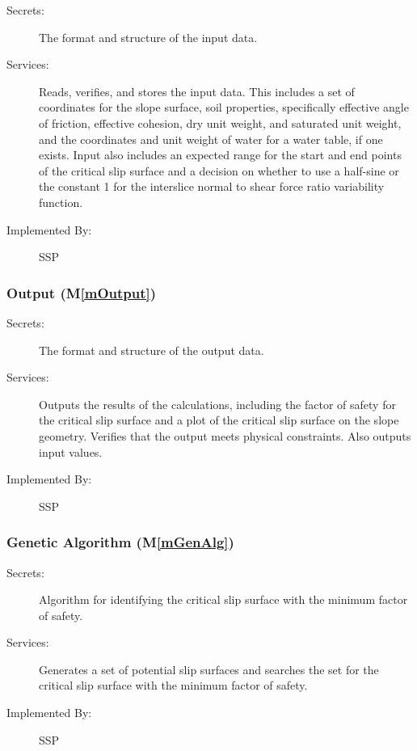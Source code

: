 \documentclass[12pt, titlepage]{article}
\newcommand{\progname}{SSP}
\newcommand{\mref}[1]{M\ref{#1}}
\begin{document}
\begin{description}
\item[Secrets:]The format and structure of the input data.
\item[Services:] Reads, verifies, and stores the input data. This includes a 
  set of coordinates for the slope surface, soil properties, 
  specifically effective angle of friction, effective cohesion, dry unit 
  weight, and saturated unit weight, and the coordinates and unit weight of 
  water for a water table, if one exists. Input also includes an expected range 
  for the start and end points of the critical slip surface and a decision on 
  whether to use a half-sine or the constant 1 for the interslice normal to 
  shear force ratio variability function.
\item[Implemented By:] \progname
\end{description}

\subsubsection{Output (\mref{mOutput})}

\begin{description}
\item[Secrets:] The format and structure of the output data.
\item[Services:] Outputs the results of the calculations, including
  the factor of safety for the critical slip surface and a plot of the critical
  slip surface on the slope geometry. Verifies that the output meets physical 
  constraints. Also outputs input values.
\item[Implemented By:] \progname
\end{description} 


\subsubsection{Genetic Algorithm (\mref{mGenAlg})}

\begin{description}
\item[Secrets:] Algorithm for identifying the critical slip surface with the 
minimum factor of safety.
\item[Services:] Generates a set of potential slip surfaces and searches the 
set for the critical slip surface with the minimum factor of safety.
\item[Implemented By:] \progname
\end{description}
\end{document}
